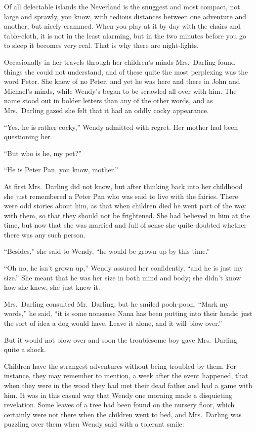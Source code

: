 Of all delectable islands the Neverland is the snuggest and most compact, not
large and sprawly, you know, with tedious distances between one adventure and
another, but nicely crammed. When you play at it by day with the chairs and
table-cloth, it is not in the least alarming, but in the two minutes before you
go to sleep it becomes very real. That is why there are night-lights.

Occasionally in her travels through her children's minds Mrs.\ Darling found
things she could not understand, and of these quite the most perplexing was the
word Peter. She knew of no Peter, and yet he was here and there in John and
Michael's minds, while Wendy's began to be scrawled all over with him. The name
stood out in bolder letters than any of the other words, and as Mrs.\ Darling
gazed she felt that it had an oddly cocky appearance.

``Yes, he is rather cocky,'' Wendy admitted with regret. Her mother had been
questioning her.

``But who is he, my pet?''

``He is Peter Pan, you know, mother.''

At first Mrs.\ Darling did not know, but after thinking back into her childhood
she just remembered a Peter Pan who was said to live with the fairies. There
were odd stories about him, as that when children died he went part of the way
with them, so that they should not be frightened. She had believed in him at the
time, but now that she was married and full of sense she quite doubted whether
there was any such person.

``Besides,'' she said to Wendy, ``he would be grown up by this time.''

``Oh no, he isn't grown up,'' Wendy assured her confidently, ``and he is just my
size.'' She meant that he was her size in both mind and body; she didn't know
how she knew, she just knew it.

Mrs.\ Darling consulted Mr.\ Darling, but he smiled pooh-pooh. ``Mark my
words,'' he said, ``it is some nonsense Nana has been putting into their heads;
just the sort of idea a dog would have. Leave it alone, and it will blow over.''

But it would not blow over and soon the troublesome boy gave Mrs.\ Darling quite
a shock.

Children have the strangest adventures without being troubled by them. For
instance, they may remember to mention, a week after the event happened, that
when they were in the wood they had met their dead father and had a game with
him. It was in this casual way that Wendy one morning made a disquieting
revelation. Some leaves of a tree had been found on the nursery floor, which
certainly were not there when the children went to bed, and Mrs.\ Darling was
puzzling over them when Wendy said with a tolerant smile:

